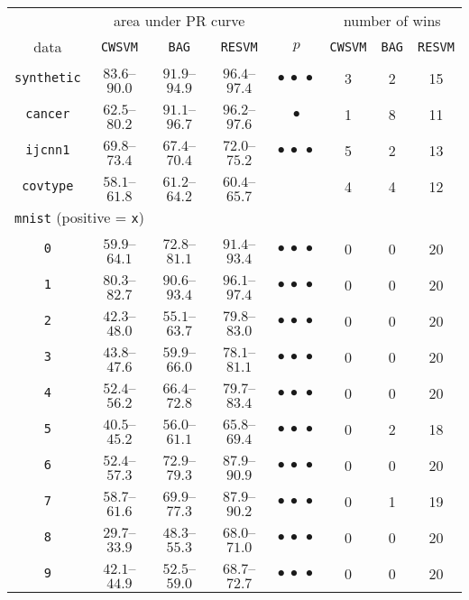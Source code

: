 \documentclass[preprint,elsarticle-num,12pt]{elsarticle}
\begin{document}
\begin{table}[!h]
\centering
\begin{tabular}{cccccccc}
\toprule
 & \multicolumn{3}{c}{area under PR curve} & & \multicolumn{3}{c}{number of wins} \\ \cline{2-4} \cline{6-8}
data & \texttt{CWSVM} & \texttt{BAG} & \texttt{RESVM} & $p$ & \texttt{CWSVM} & \texttt{BAG} & \texttt{RESVM} \\
\midrule
\texttt{synthetic} & $83.6$--$90.0$ & $91.9$--$94.9$ & $96.4$--$97.4$ & $\bullet\ \bullet\ \bullet$ & 3 & 2 & 15\\
\texttt{cancer} & $62.5$--$80.2$ & $91.1$--$96.7$ & $96.2$--$97.6$ & $\bullet$ & 1 & 8 & 11\\ 
\texttt{ijcnn1} & $69.8$--$73.4$ & $67.4$--$70.4$ & $72.0$--$75.2$ & $\bullet\ \bullet\ \bullet$ & 5 & 2 & 13\\
\texttt{covtype} & $58.1$--$61.8$ & $61.2$--$64.2$ & $60.4$--$65.7$ &  & 4 & 4 & 12\\ 
\multicolumn{3}{l}{\texttt{mnist} (positive = \texttt{x})} \\
\texttt{0} & $59.9$--$64.1$ & $72.8$--$81.1$ & $91.4$--$93.4$ & $\bullet\ \bullet\ \bullet$ & 0 & 0 & 20\\ 
\texttt{1} & $80.3$--$82.7$ & $90.6$--$93.4$ & $96.1$--$97.4$ & $\bullet\ \bullet\ \bullet$ & 0 & 0 & 20\\ 
\texttt{2} & $42.3$--$48.0$ & $55.1$--$63.7$ & $79.8$--$83.0$ & $\bullet\ \bullet\ \bullet$ & 0 & 0 & 20\\ 
\texttt{3} & $43.8$--$47.6$ & $59.9$--$66.0$ & $78.1$--$81.1$ & $\bullet\ \bullet\ \bullet$ & 0 & 0 & 20\\ 
\texttt{4} & $52.4$--$56.2$ & $66.4$--$72.8$ & $79.7$--$83.4$ & $\bullet\ \bullet\ \bullet$ & 0 & 0 & 20\\ 
\texttt{5} & $40.5$--$45.2$ & $56.0$--$61.1$ & $65.8$--$69.4$ & $\bullet\ \bullet\ \bullet$ & 0 & 2 & 18\\ 
\texttt{6} & $52.4$--$57.3$ & $72.9$--$79.3$ & $87.9$--$90.9$ & $\bullet\ \bullet\ \bullet$ & 0 & 0 & 20\\ 
\texttt{7} & $58.7$--$61.6$ & $69.9$--$77.3$ & $87.9$--$90.2$ & $\bullet\ \bullet\ \bullet$ & 0 & 1 & 19\\ 
\texttt{8} & $29.7$--$33.9$ & $48.3$--$55.3$ & $68.0$--$71.0$ & $\bullet\ \bullet\ \bullet$ & 0 & 0 & 20\\ 
\texttt{9} & $42.1$--$44.9$ & $52.5$--$59.0$ & $68.7$--$72.7$ & $\bullet\ \bullet\ \bullet$ & 0 & 0 & 20\\ 

\end{tabular}
\end{table}
\end{document}
